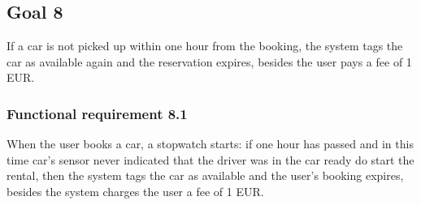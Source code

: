\subsection{Goal 8}
If a car is not picked up within one hour from the booking, the system tags the car as available again and the reservation expires, besides the user pays a fee of 1 EUR.

\setcounter{secnumdepth}{3}
\subsubsection{Functional requirement 8.1}
When the user books a car, a stopwatch starts: if one hour has passed and in this time car's sensor never indicated that the driver was in the car ready do start the rental, then the system tags the car as available and the user’s booking expires, besides the system charges the user a fee of 1 EUR.